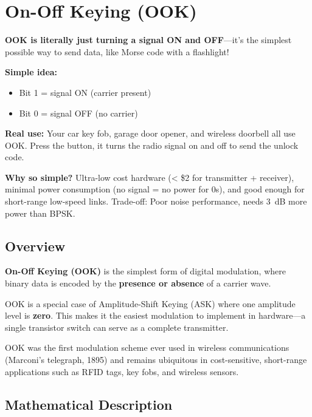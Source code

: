 \chapter{On-Off Keying (OOK)}
\label{ch:ook}

\begin{nontechnical}
\textbf{OOK is literally just turning a signal ON and OFF}---it's the simplest possible way to send data, like Morse code with a flashlight!

\textbf{Simple idea:}
\begin{itemize}
\item Bit 1 = signal ON (carrier present)
\item Bit 0 = signal OFF (no carrier)
\end{itemize}

\textbf{Real use:} Your car key fob, garage door opener, and wireless doorbell all use OOK. Press the button, it turns the radio signal on and off to send the unlock code.

\textbf{Why so simple?} Ultra-low cost hardware (< \$2 for transmitter + receiver), minimal power consumption (no signal = no power for 0s), and good enough for short-range low-speed links. Trade-off: Poor noise performance, needs 3~dB more power than BPSK.
\end{nontechnical}

\section{Overview}

\textbf{On-Off Keying (OOK)} is the simplest form of digital modulation, where binary data is encoded by the \textbf{presence or absence} of a carrier wave.

\begin{keyconcept}
OOK is a special case of Amplitude-Shift Keying (ASK) where one amplitude level is \textbf{zero}. This makes it the easiest modulation to implement in hardware---a single transistor switch can serve as a complete transmitter.
\end{keyconcept}

OOK was the first modulation scheme ever used in wireless communications (Marconi's telegraph, 1895) and remains ubiquitous in cost-sensitive, short-range applications such as RFID tags, key fobs, and wireless sensors.

\section{Mathematical Description}

